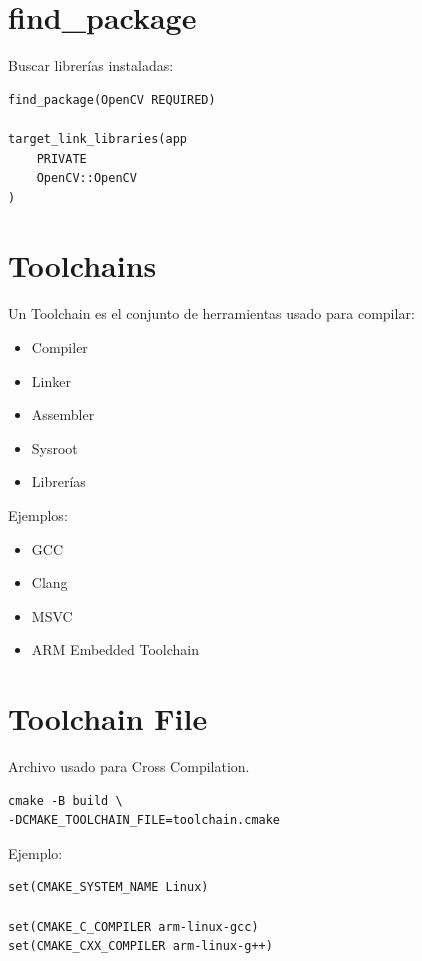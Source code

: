 \documentclass[a4paper,11pt]{article}
\begin{document}
\section*{find\_package}

Buscar librerías instaladas:

\begin{lstlisting}
find_package(OpenCV REQUIRED)

target_link_libraries(app
    PRIVATE
    OpenCV::OpenCV
)
\end{lstlisting}


\section*{Toolchains}

Un Toolchain es el conjunto de herramientas usado para compilar:

\begin{itemize}
    \item Compiler
    \item Linker
    \item Assembler
    \item Sysroot
    \item Librerías
\end{itemize}

Ejemplos:
\begin{itemize}
    \item GCC
    \item Clang
    \item MSVC
    \item ARM Embedded Toolchain
\end{itemize}


\section*{Toolchain File}

Archivo usado para Cross Compilation.

\begin{lstlisting}
cmake -B build \
-DCMAKE_TOOLCHAIN_FILE=toolchain.cmake
\end{lstlisting}

Ejemplo:

\begin{lstlisting}
set(CMAKE_SYSTEM_NAME Linux)

set(CMAKE_C_COMPILER arm-linux-gcc)
set(CMAKE_CXX_COMPILER arm-linux-g++)
\end{lstlisting}
\end{document}
